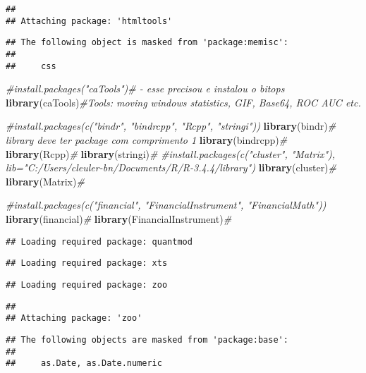 \documentclass[]{article}
\newenvironment{Shaded}{\begin{snugshade}}{\end{snugshade}}
\newcommand{\KeywordTok}[1]{\textcolor[rgb]{0.13,0.29,0.53}{\textbf{#1}}}
\newcommand{\CommentTok}[1]{\textcolor[rgb]{0.56,0.35,0.01}{\textit{#1}}}
\newcommand{\NormalTok}[1]{#1}
\begin{document}
\begin{verbatim}
## 
## Attaching package: 'htmltools'
\end{verbatim}

\begin{verbatim}
## The following object is masked from 'package:memisc':
## 
##     css
\end{verbatim}

\begin{Shaded}
\begin{Highlighting}[]
\CommentTok{#install.packages("caTools")#   - esse precisou e instalou o bitops}
\KeywordTok{library}\NormalTok{(caTools)}\CommentTok{#Tools: moving windows statistics, GIF, Base64, ROC AUC etc.}

\CommentTok{#install.packages(c("bindr", "bindrcpp", "Rcpp", "stringi"))}
\KeywordTok{library}\NormalTok{(bindr)}\CommentTok{# library deve ter package com comprimento 1}
\KeywordTok{library}\NormalTok{(bindrcpp)}\CommentTok{#}
\KeywordTok{library}\NormalTok{(Rcpp)}\CommentTok{#}
\KeywordTok{library}\NormalTok{(stringi)}\CommentTok{#}
\CommentTok{#install.packages(c("cluster", "Matrix"), lib="C:/Users/cleuler-bn/Documents/R/R-3.4.4/library")}
\KeywordTok{library}\NormalTok{(cluster)}\CommentTok{#}
\KeywordTok{library}\NormalTok{(Matrix)}\CommentTok{#}

\CommentTok{#install.packages(c("financial", "FinancialInstrument", "FinancialMath"))}
\KeywordTok{library}\NormalTok{(financial)}\CommentTok{#}
\KeywordTok{library}\NormalTok{(FinancialInstrument)}\CommentTok{#}
\end{Highlighting}
\end{Shaded}

\begin{verbatim}
## Loading required package: quantmod
\end{verbatim}

\begin{verbatim}
## Loading required package: xts
\end{verbatim}

\begin{verbatim}
## Loading required package: zoo
\end{verbatim}

\begin{verbatim}
## 
## Attaching package: 'zoo'
\end{verbatim}

\begin{verbatim}
## The following objects are masked from 'package:base':
## 
##     as.Date, as.Date.numeric
\end{verbatim}
\end{document}
